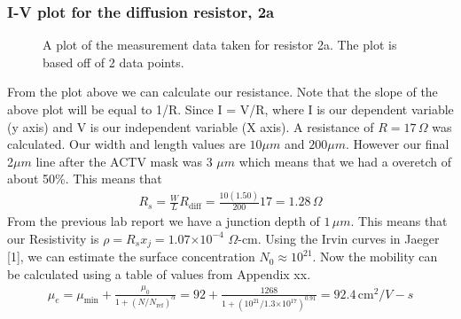 \documentclass{article}
\providecommand{\e}[1]{\ensuremath{\times 10^{#1}}}
\begin{document}
\subsubsection{I-V plot for the diffusion resistor, 2a}
\begin{figure}[H]
\centering
{}
\caption{A plot of the measurement data taken for resistor 2a. The plot is based off of 2 data points.}
\end{figure}

From the plot above we can calculate our resistance. Note that the slope of the above plot will be equal to 1/R. Since I = V/R, where I is our dependent variable (y axis) and V is our independent variable (X axis). A resistance of $R = 17 \,\Omega$ was calculated. Our width and length values are $10 \mu m$ and $200 \mu m$. However our final 2$\mu m$ line after the ACTV mask was 3 $\mu m$ which means that we had a overetch of about 50\%. This means that
\begin{align*}
R_s = \frac{W}{L}R_{\text{diff}} = \frac{10(1.50)}{200}17 = 1.28 \,\Omega
\end{align*}
From the previous lab report we have a junction depth of $1\,\mu m$. This means that our Resistivity is $\rho = R_s x_j = 1.07\e{-4}$ $\Omega$-cm. Using the Irvin curves in Jaeger [1], we can estimate the surface concentration $N_0 \approx 10^{21}$. Now the mobility can be calculated using a table of values from Appendix xx.
\begin{align*}
\mu_e = \mu_{\text{min}} + \frac{\mu_0}{1 + (N/N_{\text{ref}})^{\alpha}} = 92 + \frac{1268}{1 + (10^{21}/1.3\e{17})^{0.91}} = 92.4 \,\text{cm}^2 /V-s
\end{align*}
\end{document}
